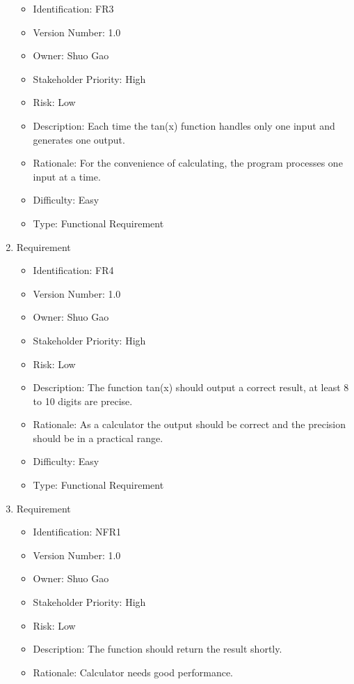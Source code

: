 \documentclass{article}
\begin{document}
\begin{enumerate}
\begin{itemize}
        \item Identification: FR3
        \item Version Number: 1.0
        \item Owner: Shuo Gao
        \item Stakeholder Priority: High
        \item Risk: Low
        \item Description: Each time the tan(x) function handles only one input and generates one output.
        \item Rationale: For the convenience of calculating, the program processes one input at a time.
        \item Difficulty: Easy
        \item Type: Functional Requirement
    \end{itemize}
    \item Requirement 
    \begin{itemize}
        \item Identification: FR4
        \item Version Number: 1.0
        \item Owner: Shuo Gao
        \item Stakeholder Priority: High
        \item Risk: Low
        \item Description: The function tan(x) should output a correct result, at least 8 to 10 digits are precise.
        \item Rationale: As a calculator the output should be correct and the precision should be in a practical range.
        \item Difficulty: Easy
        \item Type: Functional Requirement
    \end{itemize}
    \item Requirement 
    \begin{itemize}
        \item Identification: NFR1
        \item Version Number: 1.0
        \item Owner: Shuo Gao
        \item Stakeholder Priority: High
        \item Risk: Low
        \item Description: The function should return the result shortly.
        \item Rationale: Calculator needs good performance.

\end{itemize}
\end{enumerate}
\end{document}

